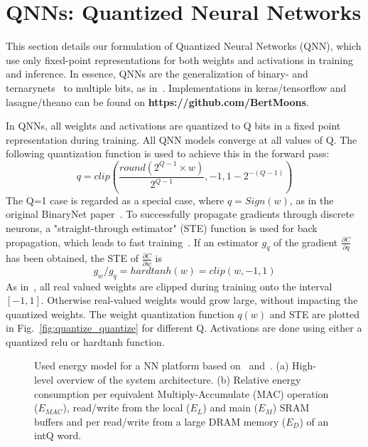 \documentclass[article,10pt]{IEEEtran}
\begin{document}
\section{QNNs: Quantized Neural Networks}
\label{sec:quantized_neural_networks}
This section details our formulation of Quantized Neural Networks (QNN), which use only fixed-point representations for both weights and activations in training and inference. In essence, QNNs are the generalization of binary- and ternarynets~\cite{hubara2016binarized,zhu2016trained} to multiple bits, as in~\cite{hubara2016quantized,zhou2016dorefa}. Implementations in keras/tensorflow and lasagne/theano can be found on \textbf{https://github.com/BertMoons}.


In QNNs, all weights and activations are quantized to Q bits in a fixed point representation during training. All QNN models converge at all values of Q. The following quantization function is used to achieve this in the forward pass:
\begin{equation}
q = clip(\frac{round(2^{Q-1}\times w)}{2^{Q-1}},-1,1-2^{-(Q-1)})
\end{equation}
The Q=1 case is regarded as a special case, where $q=Sign(w)$, as in the original BinaryNet paper~\cite{hubara2016quantized}.
To successfully propagate gradients through discrete neurons, a "straight-through estimator" (STE) function is used for back propagation, which leads to fast training~\cite{bengio2013estimating}. If an estimator $g_q$ of the gradient $\frac{\partial C}{\partial q}$ has been obtained, the STE of $\frac{\partial C}{\partial w}$ is
\begin{equation}
g_w/g_q = hardtanh(w) = clip(w,-1,1)
\end{equation}
As in~\cite{hubara2016binarized}, all real valued weights are clipped during training onto the interval $[-1,1]$. Otherwise real-valued weights would grow large, without impacting the quantized weights. The weight quantization function $q(w)$ and STE are plotted in Fig.~\ref{fig:quantize_quantize} for different Q. Activations are done using either a quantized relu or hardtanh function.

\begin{figure*}[t]
     \centering
     \hfill
     \hfill
     \caption{Used energy model for a NN platform based on~\cite{moons2017envision} and~\cite{Horowitz}. (a) High-level overview of the system architecture. (b) Relative energy consumption per equivalent Multiply-Accumulate (MAC) operation ($E_{MAC}$), read/write from the local ($E_{L}$) and main ($E_{M}$) SRAM buffers and per read/write from a large DRAM memory ($E_D$) of an intQ word.}
\label{fig:energy_modeling}
\end{figure*}
\end{document}
